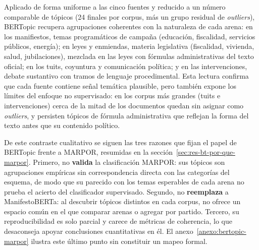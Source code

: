 Aplicado de forma uniforme a las cinco fuentes y reducido a un número comparable
de tópicos (24 finales por corpus, más un grupo residual de \emph{outliers}),
BERTopic recupera agrupaciones coherentes con la naturaleza de cada arena: en los
manifiestos, temas programáticos de campaña (educación, fiscalidad, servicios
públicos, energía); en leyes y enmiendas, materia legislativa (fiscalidad,
vivienda, salud, jubilaciones), mezclada en las leyes con fórmulas administrativas
del texto oficial; en los tuits, coyuntura y comunicación política; y en las
intervenciones, debate sustantivo con tramos de lenguaje procedimental. Esta
lectura confirma que cada fuente contiene señal temática plausible, pero también
expone los límites del enfoque no supervisado: en los corpus más grandes (tuits e
intervenciones) cerca de la mitad de los documentos quedan sin asignar como
\emph{outliers}, y persisten tópicos de fórmula administrativa que reflejan la
forma del texto antes que su contenido político.

De este contraste cualitativo se siguen las tres razones que fijan el papel de
BERTopic frente a MARPOR, resumidas en la sección~\ref{sec:res-bt-por-que-marpor}.
Primero, no \textbf{valida} la clasificación MARPOR: sus tópicos son agrupaciones
empíricas sin correspondencia directa con las categorías del esquema, de modo que
su parecido con los temas esperables de cada arena no prueba el acierto del
clasificador supervisado. Segundo, no \textbf{reemplaza} a ManifestoBERTa: al
descubrir tópicos distintos en cada corpus, no ofrece un espacio común en el que
comparar arenas o agregar por partido. Tercero, su reproducibilidad es solo
parcial y carece de métricas de coherencia, lo que desaconseja apoyar conclusiones
cuantitativas en él. El anexo~\ref{anexo:bertopic-marpor} ilustra este último
punto sin constituir un mapeo formal.

